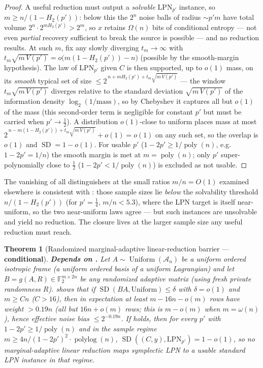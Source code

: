 \documentclass[11pt,a4paper]{article}
\theoremstyle{plain}
\newtheorem{theorem}{Theorem}[section]
\theoremstyle{definition}
\newcommand{\F}{\mathbb{F}}
\begin{document}
\begin{proof}
A useful reduction must output a \emph{solvable} $\mathrm{LPN}_{p'}$ instance, so $m\ge n/(1-H_2(p'))$: below this the $2^n$ noise balls of radius ${\sim}p'm$ have total volume $2^{n}\cdot 2^{mH_2(p')}>2^m$, so $x$ retains $\Omega(n)$ bits of conditional entropy --- not even \emph{partial} recovery sufficient to break the source is possible --- and no reduction results. At such $m$, fix any slowly diverging $t_m\to\infty$ with $t_m\sqrt{m\,V(p')}=o\bigl(m(1-H_2(p'))-n\bigr)$ (possible by the smooth-margin hypothesis). The law of $\mathrm{LPN}_{p'}$ given $C$ is then supported, up to $o(1)$ mass, on its \emph{smooth} typical set of size $\le 2^{\,n+mH_2(p')+t_m\sqrt{m\,V(p')}}$ --- the window $t_m\sqrt{m\,V(p')}$ diverges relative to the standard deviation $\sqrt{m\,V(p')}$ of the information density $\log_2(1/\text{mass})$, so by Chebyshev it captures all but $o(1)$ of the mass (this second-order term is negligible for constant $p'$ but must be carried when $p'\to\tfrac12$). A distribution $o(1)$-close to uniform places mass at most $2^{\,n-m(1-H_2(p'))+t_m\sqrt{m\,V(p')}}+o(1)=o(1)$ on any such set, so the overlap is $o(1)$ and $\operatorname{SD}=1-o(1)$. For usable $p'$ ($1-2p'\ge1/\operatorname{poly}(n)$, e.g.\ $1-2p'=1/n$) the smooth margin is met at $m=\operatorname{poly}(n)$; only $p'$ super-polynomially close to $\tfrac12$ ($1-2p'<1/\operatorname{poly}(n)$) is excluded as not usable.
\end{proof}

The vanishing of all distinguishers at the small ratios $m/n=O(1)$ examined elsewhere is consistent with : those sample sizes lie \emph{below} the solvability threshold $n/(1-H_2(p'))$ (for $p'=\tfrac14$, $m/n<5.3$), where the LPN target is itself near-uniform, so the two near-uniform laws agree --- but such instances are unsolvable and yield no reduction. The closure lives at the larger sample size any useful reduction must reach.

\begin{theorem}[Randomized marginal-adaptive linear-reduction barrier --- \textbf{conditional}]
\label{thm:marginal-adaptive}
\textbf{Depends on .}  Let $A\sim\operatorname{Uniform}(\mathcal{A}_n)$ be a uniform ordered isotropic frame (a uniform ordered basis of a uniform Lagrangian) and let $B=g(A,R)\in\F_2^{m\times 2n}$ be any randomized adaptive matrix (using fresh private randomness $R$).   shows that if $\operatorname{SD}(BA,\text{Uniform})\le\delta$ with $\delta=o(1)$ and $m\ge Cn$ ($C>16$), then \emph{in expectation} at least $m-16n-o(m)$ rows have weight $>0.19n$ (all but $16n+o(m)$ rows; this is $m-o(m)$ when $m=\omega(n)$), hence effective noise bias $\le 2^{-0.19n}$.  If  holds, then for every $p'$ with $1-2p'\ge 1/\operatorname{poly}(n)$ and in the sample regime $m\ge 4n/(1-2p')^2\cdot\operatorname{polylog}(n)$, $\operatorname{SD}((C,y),\mathrm{LPN}_{p'})=1-o(1)$, so no marginal-adaptive linear reduction maps symplectic LPN to a usable standard LPN instance in that regime.
\end{theorem}
\end{document}
